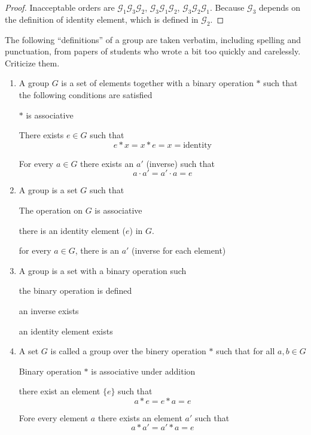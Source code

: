 \begin{proof}
    Inacceptable orders are $\mathscr{G}_{1}\mathscr{G}_{3}\mathscr{G}_{2}$, $\mathscr{G}_{3}\mathscr{G}_{1}\mathscr{G}_{2}$, $\mathscr{G}_{3}\mathscr{G}_{2}\mathscr{G}_{1}$. Because $\mathcal{G}_{3}$ depends on the definition of identity element, which is defined in $\mathcal{G}_{2}$.
\end{proof}

\newpage
\begin{exercise}
    The following ``definitions'' of a group are taken verbatim, including spelling and punctuation, from papers of students who wrote a bit too quickly and carelessly. Criticize them.
    \begin{enumerate}
        \item A group $G$ is a set of elements together with a binary operation $*$ such that the following conditions are satisfied

              $*$ is associative

              There exists $e\in G$ such that
              \[
                  e * x = x * e = x = \text{identity}
              \]

              For every $a\in G$ there exists an $a'$ (inverse) such that
              \[
                  a\cdot a' = a'\cdot a = e
              \]
        \item A group is a set $G$ such that

              The operation on $G$ is associative

              there is an identity element ($e$) in $G$.

              for every $a\in G$, there is an $a'$ (inverse for each element)
        \item A group is a set with a binary operation such

              the binary operation is defined

              an inverse exists

              an identity element exists
        \item A set $G$ is called a group over the binery operation $*$ such that for all $a, b\in G$

              Binary operation $*$ is associative under addition

              there exist an element $\{e\}$ such that
              \[
                  a * e = e * a = e
              \]

              Fore every element $a$ there exists an element $a'$ such that
              \[
                  a * a' = a' * a = e
              \]
    \end{enumerate}
\end{exercise}


